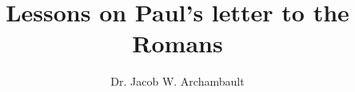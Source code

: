 \documentclass[a4paper,12pt]{book}
\begin{document}
\author{Dr. Jacob W. Archambault}
\title{Lessons on Paul's letter to the Romans}

\frontmatter
\maketitle
\tableofcontents

\mainmatter

%

\backmatter
\end{document}
